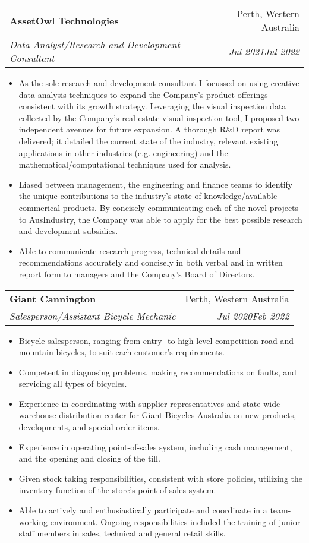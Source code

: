 \documentclass[letterpaper,10.8pt]{article}
\makeatletter
\newcommand{\resumeItem}[2]{
  \item\small{
    \textbf{#1}{#2 \vspace{-2pt}}
  }
}
\newcommand{\resumeSubheading}[4]{
  \vspace{-1pt}\item
    \begin{tabular*}{0.97\textwidth}{l@{\extracolsep{\fill}}r}
      \textbf{#1} & #2 \\
      \textit{\small#3} & \textit{\small #4} \\
    \end{tabular*}\vspace{-5pt}
}
\newcommand{\resumeItemListStart}{\begin{itemize}}
\newcommand{\resumeItemListEnd}{\end{itemize}\vspace{-5pt}}
\makeatother
\begin{document}
    \resumeSubheading
    {AssetOwl Technologies}{Perth, Western Australia}
    {Data Analyst/Research and Development Consultant}{Jul 2021\textendash Jul 2022}
    \resumeItemListStart
        \resumeItem{}{As the sole research and development consultant I focussed on using creative data analysis techniques to expand the Company's product offerings consistent with its growth strategy. Leveraging the visual inspection data collected by the Company's real estate visual inspection tool, I proposed two independent avenues for future expansion. A thorough R\&D report was delivered; it detailed the current state of the industry, relevant existing applications in other industries (e.g. engineering) and the mathematical/computational techniques used for analysis.}
        \resumeItem{}{Liased between management, the engineering and finance teams to identify the unique contributions to the industry's state of knowledge/available commerical products. By concisely communicating each of the novel projects to AusIndustry, the Company was able to apply for the best possible research and development subsidies.}
        \resumeItem{}{Able to communicate research progress, technical details and recommendations accurately and concisely in both verbal and in written report form to managers and the Company's Board of Directors.}
    \resumeItemListEnd
      
    \resumeSubheading
		{Giant Cannington}{Perth, Western Australia}
		{Salesperson/Assistant Bicycle Mechanic}{Jul 2020\textendash Feb 2022}
		\resumeItemListStart
        \resumeItem{}{Bicycle salesperson, ranging from entry- to high-level competition road and mountain bicycles, to suit each customer's requirements.}
        \resumeItem{}{Competent in diagnosing problems, making recommendations on faults, and servicing all types of bicycles.}
        \resumeItem{}{Experience in coordinating with supplier representatives and state-wide warehouse distribution center for Giant Bicycles Australia on new products, developments, and special-order items.}
        \resumeItem{}{Experience in operating point-of-sales system, including cash management, and the opening and closing of the till.}
        \resumeItem{}{Given stock taking responsibilities, consistent with store policies, utilizing the inventory function of the store’s point-of-sales system.}
        \resumeItem{}{Able to actively and enthusiastically participate and coordinate in a team-working environment. Ongoing responsibilities included the training of junior staff members in sales, technical and general retail skills.}
    \resumeItemListEnd
\end{document}
